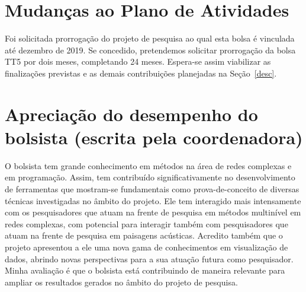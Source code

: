\documentclass[a4paper, 11pt]{article}
\begin{document}
\section{Mudanças ao Plano de Atividades}
Foi solicitada prorrogação do projeto de pesquisa ao qual esta bolsa é vinculada até dezembro de 2019. Se concedido, pretendemos solicitar prorrogação da bolsa TT5 por dois meses, completando 24 meses. Espera-se assim viabilizar as finalizações previstas e as demais contribuições planejadas na Seção~\ref{desc}.

\section{Apreciação do desempenho do bolsista (escrita pela coordenadora)}
O bolsista tem grande conhecimento em métodos na área de redes complexas e em programação. Assim, tem contribuído significativamente no desenvolvimento de ferramentas que mostram-se fundamentais como prova-de-conceito de diversas técnicas investigadas no âmbito do projeto. Ele tem interagido mais intensamente com os pesquisadores que atuam na frente de pesquisa em métodos multinível em redes complexas, com potencial para interagir também com pesquisadores que atuam na frente de pesquisa em paisagens acústicas. Acredito também que o projeto apresentou a ele uma nova gama de conhecimentos em visualização de dados, abrindo novas perspectivas para a sua atuação futura como pesquisador. Minha avaliação é que o bolsista está contribuindo de maneira relevante para ampliar os resultados gerados no âmbito do projeto de pesquisa.


\end{document}
